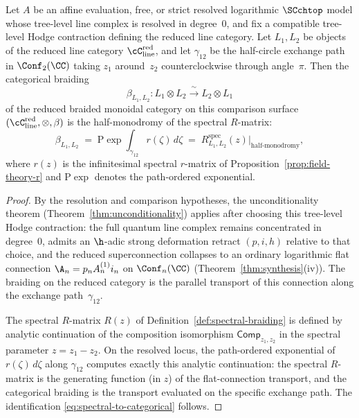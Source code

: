 \begin{proposition}
\label{prop:spectral-to-categorical}
Let $A$ be an affine evaluation, free, or strict resolved logarithmic
$\SCchtop$ model whose tree-level line complex is resolved in
degree~$0$, and fix a compatible tree-level Hodge contraction defining
the reduced line category.
Let $L_1, L_2$ be objects of the reduced line category
$\cC_{\mathrm{line}}^{\mathrm{red}}$, and let $\gamma_{12}$ be the
half-circle exchange path in $\Conf_2(\CC)$ taking $z_1$ around~$z_2$
counterclockwise through angle~$\pi$. Then the categorical braiding
\[
\beta_{L_1,L_2} \colon L_1 \otimes L_2 \xrightarrow{\ \sim\ }
 L_2 \otimes L_1
\]
of the reduced braided monoidal category on this comparison surface
$(\cC_{\mathrm{line}}^{\mathrm{red}}, \otimes, \beta)$ is
the half-monodromy of the spectral $R$-matrix:
\begin{equation}\label{eq:spectral-to-categorical}
\beta_{L_1,L_2}
\;=\; \mathrm{P}\!\exp\!\int_{\gamma_{12}} r(\zeta)\,d\zeta
\;=\; R^{\mathrm{spec}}_{L_1,L_2}(z)\big|_{\text{half-monodromy}},
\end{equation}
where $r(z)$ is the infinitesimal spectral $r$-matrix of
Proposition~\textup{\ref{prop:field-theory-r}} and
$\mathrm{P}\!\exp$ denotes the path-ordered exponential.
\end{proposition}

\begin{proof}
By the resolution and comparison hypotheses, the unconditionality theorem
(Theorem~\ref{thm:unconditionality}) applies after choosing this
tree-level Hodge contraction: the full quantum line complex remains
concentrated in degree~$0$, admits an $\h$-adic strong deformation
retract $(p,i,h)$ relative to that choice, and the reduced
superconnection collapses to an ordinary logarithmic flat connection
$\A_n = p_n A_n^{(1)} i_n$ on $\Conf_n(\CC)$
(Theorem~\ref{thm:synthesis}(iv)). The braiding on the reduced
category is the parallel transport of this connection along the
exchange path~$\gamma_{12}$.

The spectral $R$-matrix $R(z)$ of
Definition~\ref{def:spectral-braiding} is defined by analytic
continuation of the composition isomorphism
$\mathsf{Comp}_{z_1,z_2}$ in the spectral parameter
$z = z_1 - z_2$. On the resolved locus, the path-ordered
exponential of $r(\zeta)\,d\zeta$ along $\gamma_{12}$ computes
exactly this analytic continuation: the spectral $R$-matrix is the
generating function (in $z$) of the flat-connection transport,
and the categorical braiding is the transport evaluated on the
specific exchange path. The identification
\eqref{eq:spectral-to-categorical} follows.
\end{proof}

